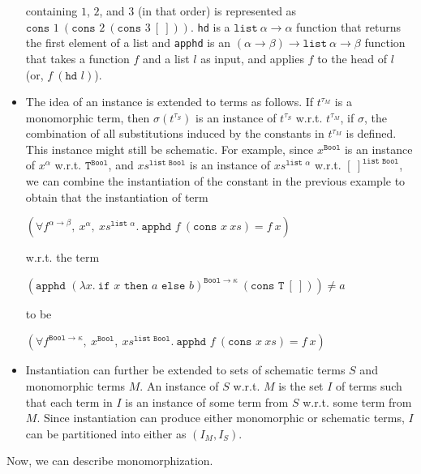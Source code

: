 \documentclass{article}
\begin{document}
\begin{itemize}
		containing $1$, $2$, and $3$ (in that 
		order) is represented as 
		$\texttt{cons }1\ (\texttt{cons }2
		\ (\texttt{cons }3\ [\ ]))$.
		\texttt{hd} is a $\texttt{list}\ 
		\alpha \to \alpha$ function that 
		returns the first element of a list 
		and \texttt{apphd} is an $(\alpha
		\to \beta) \to \texttt{list}\
		\alpha \to \beta$ function that
		takes a function $f$ and a list 
		$l$ as input, and applies $f$
		to the head of $l$ (or, $f\ 
		(\texttt{hd }l)$).
		\item The idea of an instance is 
		extended to terms as follows. If 
		$t^{\tau_M}$ is a monomorphic term, 
		then $\sigma(t^{\tau_S})$ is an instance 
		of $t^{\tau_S}$ w.r.t. $t^{\tau_M}$, if 
		$\sigma$, the combination of all 
		substitutions induced by the 
		constants in $t^{\tau_M}$ is defined. This 
		instance might still be schematic. For 
		example, since $x^{\texttt{Bool}}$ is 
		an instance of $x^{\alpha}$ w.r.t.
		$\texttt{T}^{\texttt{Bool}}$, 
		and $xs^{\texttt{list Bool}}$ is 
		an instance of 
		$xs^{\texttt{list }\alpha}$ 
		w.r.t. $[\ ]^{\texttt{list Bool}}$,
		we can combine the instantiation 
		of the constant in the previous 
		example to obtain that the 
		instantiation of term
		\begin{center}
			$(\forall f^{\alpha \to \beta},\ 
			x^{\alpha},\ xs^{\texttt{list }
				\alpha}.\ \texttt{apphd }f\ 
			(\texttt{cons }x\ xs) = f\ x)$
		\end{center}
		w.r.t. the term
		\begin{center}
			$(\texttt{apphd }(\lambda 
			x.\ \texttt{if }x\texttt{ then }
			a \texttt{ else } b)^{\texttt{Bool} 
				\to \kappa}\ (\texttt{cons T}\ 
			[\ ])) \neq a$
		\end{center}
		to be
		\begin{center}
			$(\forall f^{\texttt{Bool}
				\to \kappa},\ x^{\texttt{Bool}},
			\ xs^{\texttt{list Bool}}.\ 
			\texttt{apphd }f\ (\texttt{cons }x
			\ xs) = f\ x)$
		\end{center}
		\item Instantiation can further be 
		extended to sets of schematic 
		terms $S$ and monomorphic terms $M$. 
		An instance of $S$ w.r.t. 
		$M$ is the set $I$ of terms such 
		that each term in $I$ is an instance 
		of some term from $S$ w.r.t. 
		some term from $M$. Since 
		instantiation can produce either 
		monomorphic or schematic terms, $I$
		can be partitioned into either as
		$(I_M, I_S)$.
	\end{itemize}
	Now, we can describe monomorphization.
\end{document}
